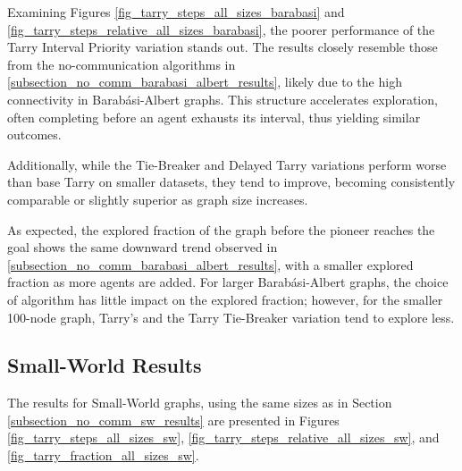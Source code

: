 Examining Figures \ref{fig_tarry_steps_all_sizes_barabasi} and \ref{fig_tarry_steps_relative_all_sizes_barabasi}, the poorer performance of the Tarry Interval Priority variation stands out. The results closely resemble those from the no-communication algorithms in \ref{subsection_no_comm_barabasi_albert_results}, likely due to the high connectivity in Barabási-Albert graphs. This structure accelerates exploration, often completing before an agent exhausts its interval, thus yielding similar outcomes.

Additionally, while the Tie-Breaker and Delayed Tarry variations perform worse than base Tarry on smaller datasets, they tend to improve, becoming consistently comparable or slightly superior as graph size increases.

As expected, the explored fraction of the graph before the pioneer reaches the goal shows the same downward trend observed in \ref{subsection_no_comm_barabasi_albert_results}, with a smaller explored fraction as more agents are added. For larger Barabási-Albert graphs, the choice of algorithm has little impact on the explored fraction; however, for the smaller 100-node graph, Tarry's and the Tarry Tie-Breaker variation tend to explore less.
    
\subsection{Small-World Results} 
\label{subsection_tarry_sw_results}

The results for Small-World graphs, using the same sizes as in Section \ref{subsection_no_comm_sw_results} are presented in Figures \ref{fig_tarry_steps_all_sizes_sw}, \ref{fig_tarry_steps_relative_all_sizes_sw}, and \ref{fig_tarry_fraction_all_sizes_sw}.

